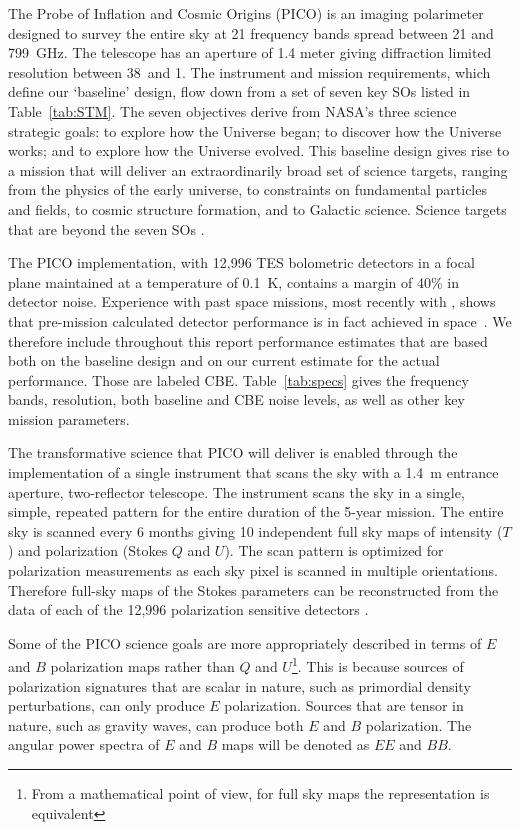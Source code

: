 \documentclass[PICOReport.tex]{subfiles}
\begin{document}
 
The Probe of Inflation and Cosmic Origins (PICO) is an imaging polarimeter designed to survey the entire sky at 21 frequency bands spread between 21 and 799~GHz.  The telescope has an aperture of 1.4 meter giving diffraction limited resolution between 38\arcmin\ and 1\arcmin . The instrument and mission requirements, which define our `baseline' design, flow down from a set of seven key \ac{SOs} listed in Table~\ref{tab:STM}. The seven objectives derive from NASA's three science strategic goals: to explore how the Universe began; to discover how the Universe works; and to explore how the Universe evolved.  This baseline design gives rise to a mission that will deliver an extraordinarily broad set of science targets, ranging from the physics of the early universe, to constraints on fundamental particles and fields, to cosmic structure formation, and to Galactic science. Science targets that are beyond the seven \ac{SOs} . 

The PICO implementation, with 12,996 \ac{TES} bolometric detectors in a focal plane maintained at a temperature of 0.1~K, contains a margin of 40\% in detector noise. Experience with past space missions, most recently with \planck , shows that pre-mission calculated detector performance is in fact achieved in space~\cite{??}. We therefore include throughout this report performance estimates that are based both on the baseline design and on our current estimate for the actual performance. Those are labeled \ac{CBE}. Table~\ref{tab:specs} gives the frequency bands, resolution, both baseline and \ac{CBE} noise levels, as well as other key mission parameters. 

The transformative science that PICO will deliver is enabled through the implementation of a single instrument that scans the sky with a 1.4~m entrance aperture, two-reflector telescope. The instrument scans the sky in a single, simple, repeated pattern for the entire duration of the 5-year mission. The entire sky is scanned every 6 months giving 10 independent full sky maps of intensity ($T$) and polarization (Stokes $Q$ and $U$). The scan pattern is optimized for polarization measurements as each sky pixel is scanned in multiple orientations. Therefore full-sky maps of the Stokes parameters can be reconstructed from the data of each of the 12,996 polarization sensitive detectors . 

Some of the PICO science goals are more appropriately described in terms of $E$ and $B$ polarization maps rather than $Q$ and $U$\footnote{From a mathematical point of view, for full sky maps the representation is equivalent}. This is because sources of polarization signatures that are scalar in nature, such as primordial density perturbations, can only produce $E$ polarization. Sources that are tensor in nature, such as gravity waves, can produce both $E$ and $B$ polarization. The angular power spectra of $E$ and $B$ maps will be denoted as $EE$ and $BB$.  
\end{document}

